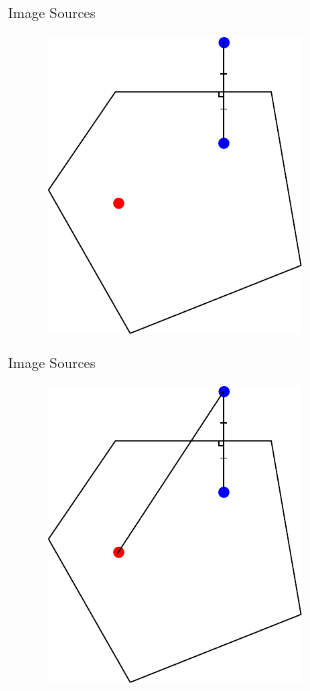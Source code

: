 \documentclass{beamer}
\begin{document}
\begin{frame}{Image Sources}

\begin{figure}[t]
	\centering
    \includegraphics[width=0.6\textwidth]{ImageSourcesDrawn0.pdf}
\end{figure}

\end{frame}

\begin{frame}{Image Sources}

\begin{figure}[t]
	\centering
    \includegraphics[width=0.6\textwidth]{ImageSourcesDrawn1.pdf}
\end{figure}

\end{frame}
\end{document}
